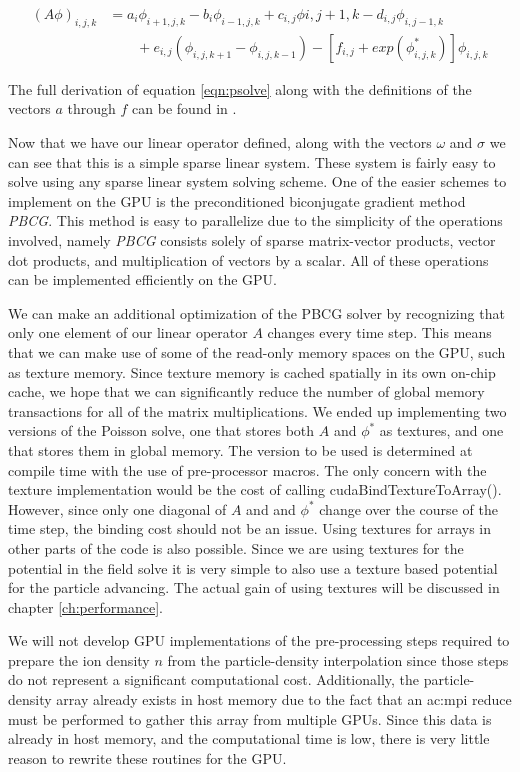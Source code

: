 \begin{align}
(A\phi)_{i,j,k} &= a_i\phi_{i+1,j,k}
		  -b_i\phi_{i-1,j,k}
		  +c_{i,j}\phi{i,j+1,k}
		  -d_{i,j}\phi_{i,j-1,k} \nonumber \\
		  &\qquad{} +e_{i,j}(\phi_{i,j,k+1}-\phi_{i,j,k-1})
		  -[f_{i,j} + exp(\phi_{i,j,k}^*)]\phi_{i,j,k}
\label{eqn:psolve}
\end{align}

The full derivation of equation \ref{eqn:psolve} along with the definitions of the vectors $a$ through $f$ can be found in \cite{Haakonsen2011}.

Now that we have our linear operator defined, along with the vectors $\omega$ and $\sigma$ we can see that this is a simple sparse linear system. These system is fairly easy to solve using any sparse linear system solving scheme. One of the easier schemes to implement on the GPU is the preconditioned biconjugate gradient method \emph{PBCG}. This method is easy to parallelize due to the simplicity of the operations involved, namely \emph{PBCG} consists solely of sparse matrix-vector products, vector dot products, and multiplication of vectors by a scalar. All of these operations can be implemented efficiently on the GPU. 

We can make an additional optimization of the PBCG solver by recognizing that only one element of our linear operator $A$ changes every time step. This means that we can make use of some of the read-only memory spaces on the GPU, such as texture memory. Since texture memory is cached spatially in its own on-chip cache, we hope that we can significantly reduce the number of global memory transactions for all of the matrix multiplications. We ended up implementing two versions of the Poisson solve, one that stores both $A$ and $\phi^*$ as textures, and one that stores them in global memory. The version to be used is determined at compile time with the use of pre-processor macros. 
The only concern with the texture implementation would be the cost of calling cudaBindTextureToArray(). However, since only one diagonal of $A$ and and $\phi^*$ change over the course of the time step, the binding cost should not be an issue. Using textures for arrays in other parts of the code is also possible. Since we are using textures for the potential in the field solve it is very simple to also use a texture based potential for the particle advancing. The actual gain of using textures will be discussed in chapter \ref{ch:performance}.

We will not develop GPU implementations of the pre-processing steps required to prepare the ion density $n$ from the particle-density interpolation since those steps do not represent a significant computational cost. Additionally, the particle-density array already exists in host memory due to the fact that an \gls{ac:mpi} reduce must be performed to gather this array from multiple GPUs. Since this data is already in host memory, and the computational time is low, there is very little reason to rewrite these routines for the GPU.  



